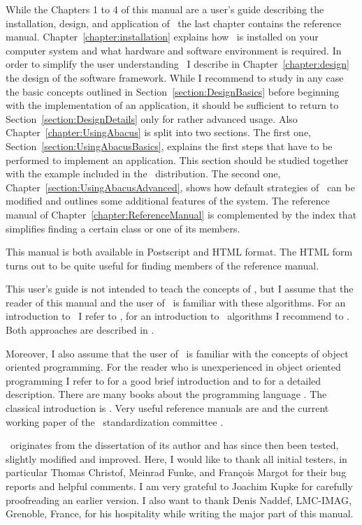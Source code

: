 While the Chapters 1 to 4 of this manual are a user's guide describing
the installation, design, and application of \ABACUS\, the last 
chapter contains the reference manual.
Chapter~\ref{chapter:installation} explains how \ABACUS\ is installed
on your computer system and what hardware and software environment is
required. In order to simplify the user understanding \ABACUS\
I describe in Chapter~\ref{chapter:design} the design of the software
framework. While I recommend to study in any case the basic concepts outlined
in Section~\ref{section:DesignBasics} before beginning with the 
implementation of an application, it should be sufficient to return
to Section~\ref{section:DesignDetails} only for rather advanced
usage. Also Chapter~\ref{chapter:UsingAbacus} is split into two
sections. The first one, Section~\ref{section:UsingAbacusBasics},
explains the first steps that have to be performed to implement an
application. This section should be studied together with the example
included in the \ABACUS\ distribution. The second one, 
Chapter~\ref{section:UsingAbacusAdvanced}, shows how default strategies
of \ABACUS\ can be modified and outlines some additional features
of the system. The reference manual of 
Chapter~\ref{chapter:ReferenceManual} is complemented by the index that
simplifies finding a certain class or one of its members.

This manual is both available in Postscript and HTML format.
The HTML form turns out to be quite useful for finding members
of the reference manual.

This user's guide is not intended to teach the concepts of 
\lpbab, but I assume that the reader of this manual and the user
of \ABACUS\ is familiar with these algorithms. For an introduction
to \bac\ I refer to \cite{JRT95}, for an introduction to \bap\
algorithms I recommend to \cite{BJN97}. Both approaches are described
in \cite{Thi95}.

Moreover, I also assume that the user of \ABACUS\ is familiar with
the concepts of object oriented programming.
For the reader who is unexperienced in object oriented programming I refer to \cite{KM90} for
a good brief introduction and to \cite{Boo94} for a detailed
description. There are many books about the programming language
\CPLUSPLUS. The classical introduction is \cite{Str93a}. Very
useful reference manuals are \cite{ES92} and the current working
paper of the \CPLUSPLUS\ standardization committee \cite{Iso95}.

\ABACUS\ originates from the dissertation of its author \cite{Thi95}
and has since then been tested, slightly modified and
improved. Here, I would like to thank all initial testers, in
particular Thomas Christof, Meinrad Funke, and Fran\c{c}ois Margot
for their bug reports and helpful comments. I am very grateful to
Joachim Kupke for carefully proofreading an earlier version. I also
want to thank Denis Naddef, LMC-IMAG, Grenoble, France, for his
hospitality while writing the major part of this manual.

